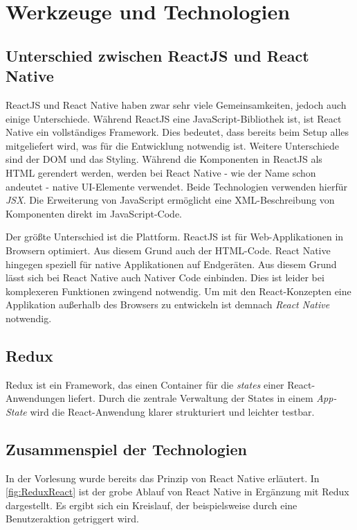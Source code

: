 \section{Werkzeuge und Technologien}
\subsection{Unterschied zwischen ReactJS und React Native}
ReactJS und React Native haben zwar sehr viele Gemeinsamkeiten, jedoch auch einige Unterschiede.
Während ReactJS eine JavaScript-Bibliothek ist, ist React Native ein vollständiges Framework. Dies bedeutet, dass bereits beim Setup alles mitgeliefert wird, was für die
Entwicklung notwendig ist. Weitere Unterschiede sind der DOM und das Styling. Während die Komponenten in ReactJS als HTML gerendert werden, werden bei React Native - wie der Name schon andeutet - native UI-Elemente verwendet.
Beide Technologien verwenden hierfür \textit{JSX}.
Die Erweiterung von JavaScript ermöglicht eine XML-Beschreibung von Komponenten direkt im JavaScript-Code.

Der größte Unterschied ist die Plattform. ReactJS ist für Web-Applikationen in Browsern optimiert. Aus diesem Grund auch der HTML-Code. React Native hingegen speziell für native Applikationen auf Endgeräten.
Aus diesem Grund lässt sich bei React Native auch Nativer Code einbinden. Dies ist leider bei komplexeren Funktionen zwingend notwendig. Um mit den React-Konzepten eine Applikation außerhalb des
Browsers zu entwickeln ist demnach \textit{React Native} notwendig. \cite{ReactJSvsReactNative:online}

\subsection{Redux}
Redux ist ein Framework, das einen Container für die \textit{states} einer React-Anwendungen liefert. Durch die zentrale Verwaltung der States in einem \textit{App-State}
wird die React-Anwendung klarer strukturiert und leichter testbar.

\subsection{Zusammenspiel der Technologien}
In der Vorlesung wurde bereits das Prinzip von React Native erläutert. In \autoref{fig:ReduxReact} ist
der grobe Ablauf von React Native in Ergänzung mit Redux dargestellt. Es ergibt sich ein Kreislauf, der beispielsweise durch
eine Benutzeraktion getriggert wird.

